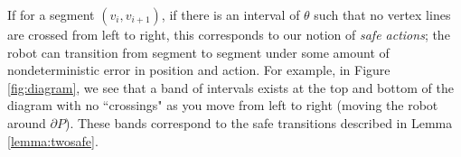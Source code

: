 \documentclass[]{styles/svproc}  %
\begin{document}
If for a segment $(v_i, v_{i+1})$, if there is an interval of $\theta$ such that
no vertex lines are crossed from left to right, this corresponds to our notion
of \emph{safe actions}; the robot can transition from segment to segment under
some amount of nondeterministic error in position and action.
For example, in
Figure \ref{fig:diagram}, we see that a band of intervals exists at the top and
bottom of the diagram with no ``crossings" as you move from left to right
(moving the robot around $\partial P$). These bands correspond to the safe
transitions described in Lemma \ref{lemma:twosafe}.

%
\end{document}
